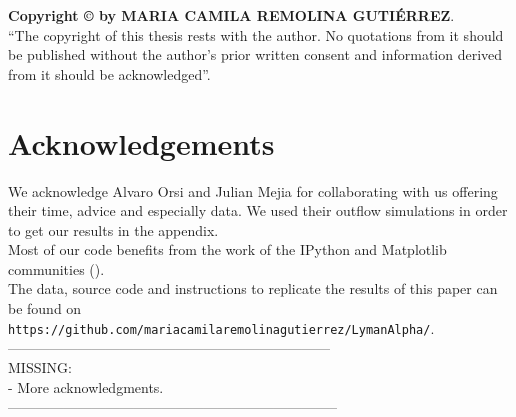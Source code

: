 \vspace{4in}
\noindent \textbf{Copyright \copyright{} by MARIA CAMILA REMOLINA GUTI\'ERREZ}.\\
``The copyright of this thesis rests with the author.  No quotations
from it should be published without the author's prior written consent
and information derived from it should be acknowledged''.

\chapter*{Acknowledgements}
We acknowledge Alvaro Orsi and Julian Mejia for collaborating with us offering their time, advice and especially data. We used their outflow simulations in order to get our results in the appendix.\\

Most of our code benefits from the work of the IPython and Matplotlib communities (\cite{IPython,matplotlib}).\\

The data, source code and instructions to replicate the results of this paper can be found on \texttt{https://github.com/mariacamilaremolinagutierrez/LymanAlpha/}. \\


---------------------------------------------------------------------\\
MISSING: \\
- More acknowledgments.\\
-----------------------------------------------------------------------\\


\tableofcontents
\clearpage